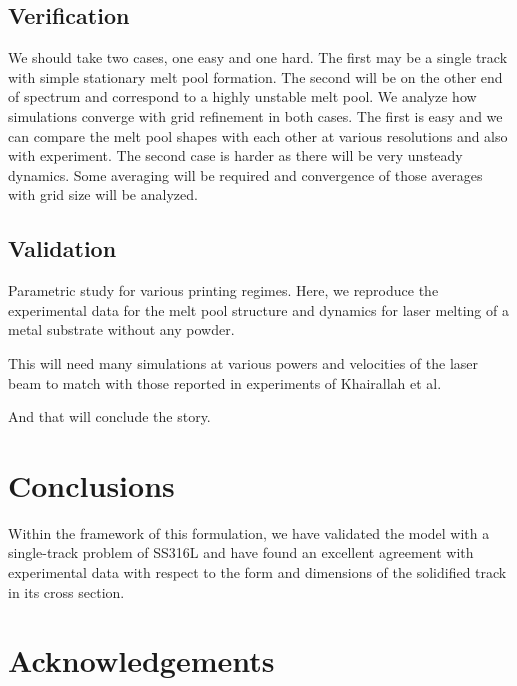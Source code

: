 \documentclass[final]{elsarticle} %
\begin{document}
\subsection{Verification}

We should take two cases, one easy and one hard. The first may be a single track with simple stationary melt pool formation. The second will be on the other end of spectrum and correspond to a highly unstable melt pool. We analyze how simulations converge with grid refinement in both cases. The first is easy and we can compare the melt pool shapes with each other at various resolutions and also with experiment. The second case is harder as there will be very unsteady dynamics. Some averaging will be required and convergence of those averages with grid size will be analyzed.

\subsection{Validation}

Parametric study for various printing regimes. Here, we reproduce the experimental data for the melt pool structure and dynamics for laser melting of a metal substrate without any powder.

This will need many simulations at various powers and velocities of the laser beam to match with those reported in experiments of Khairallah et al.

And that will conclude the story.

\section{Conclusions}

Within the framework of this formulation, we have validated the model with a single-track problem of SS316L and have found an excellent agreement with experimental data
with respect to the form and dimensions of the solidified track in its cross section.

\section{Acknowledgements}

\appendix
\end{document}
